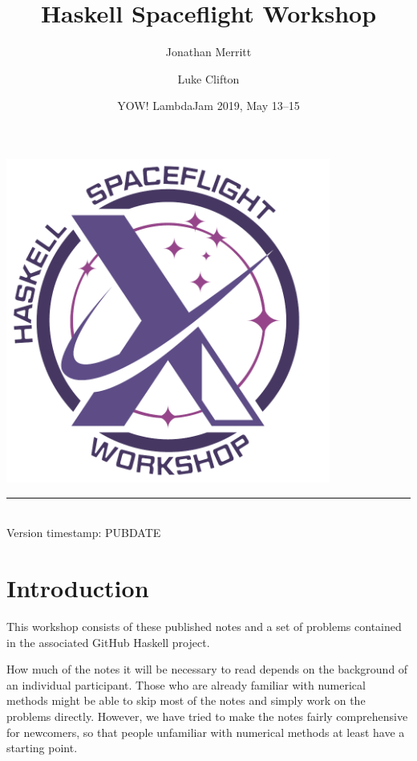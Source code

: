 \documentclass[12pt,openany]{book}
\title{Haskell Spaceflight Workshop}
\author{Jonathan Merritt \and Luke Clifton}
\date{YOW! LambdaJam 2019, May 13--15}
\begin{document}
\begin{titlepage}
\begin{center}
  \vspace*{1.5cm}
  {\Huge\textsf{\MakeUppercase{\thetitle}}}\par
  \vspace{1.cm}
  \includegraphics[width=0.8\textwidth]{fig/logo-text.pdf}\par
  \vspace{1.cm}
  {\Large\textsf{\theauthor}}\par
  \vspace{0.2em}
  {\Large\textsf{\thedate}}\par           
  \vspace{0.5cm}
  \rule{2cm}{0.5pt}\\\vspace{0.2cm}
  \textsf{Version timestamp: PUBDATE}
\end{center}
\end{titlepage}

\tableofcontents

\chapter{Introduction}

This workshop consists of these published notes and a set of problems contained in the associated GitHub Haskell project.

How much of the notes it will be necessary to read depends on the background of an individual participant. Those who are already familiar with numerical methods might be able to skip most of the notes and simply work on the problems directly. However, we have tried to make the notes fairly comprehensive for newcomers, so that people unfamiliar with numerical methods at least have a starting point.
\end{document}
